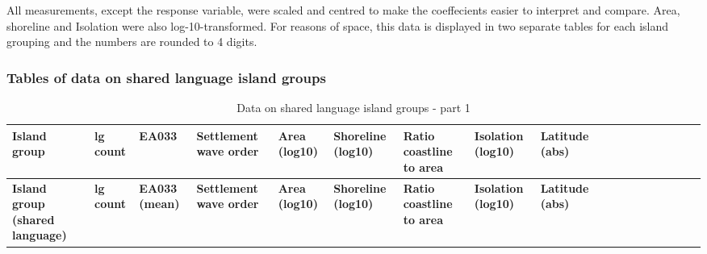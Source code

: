 \documentclass[draft,10pt]{article} %
\begin{document}
All measurements, except the response variable, were scaled and centred to make the coeffecients easier to interpret and compare. Area, shoreline and Isolation were also log-10-transformed. For reasons of space, this data is displayed in two separate tables for each island grouping and the numbers are rounded to 4 digits.

\subsubsection{Tables of data on shared language island groups}
\label{shared_language_groups}

\begin{landscape}
\begin{longtable}{| p{2.6cm} |  p{1cm} | p{1.2cm}  | p{1.9cm}  | p{1.7cm}  | p{1.7cm}  | p{1.7cm}  | p{1.6cm} | p{1.5cm}  | p{1cm} | p{1cm}  | p{1cm}  |p{1cm}  | p{1cm}    | p{1cm}    | p{1cm}    | p{1cm}    |p{1cm}    |}

\caption{{Data on shared language island groups - part 1}} 
\label{shared_language_groups_table} \\
\hline
\textbf{Island group} & \textbf{lg  count } & \textbf{EA033} & \textbf{Settlement wave order} & \textbf{Area (log10)} & \textbf{Shoreline (log10)} & \textbf{Ratio coastline to  area} & \textbf{Isolation (log10)} & \textbf{Latitude (abs)}  \\ \hline

\endfirsthead

\hline
\textbf{Island group (shared language)} & \textbf{lg  count } & \textbf{EA033 (mean)} & \textbf{Settlement wave order} & \textbf{Area (log10)} & \textbf{Shoreline (log10)} & \textbf{Ratio coastline to  area} & \textbf{Isolation (log10)} & \textbf{Latitude (abs)}  \\ \hline
\endhead


\end{longtable}
\end{landscape}
\end{document}
